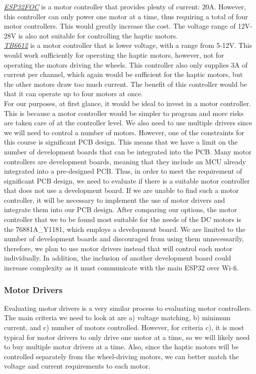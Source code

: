 \noindent \underline{\textit{ESP32FOC}} is a motor controller that provides plenty of current: 20A. However, this controller can only power one motor at a time, thus requiring a total of four motor controllers. This would greatly increase the cost. The voltage range of 12V-28V is also not suitable for controlling the haptic motors.\\

\noindent \underline{\textit{TB6612}} is a motor controller that is lower voltage, with a range from 5-12V. This would work sufficiently for operating the haptic motors, however, not for operating the motors driving the wheels. This controller also only supplies 3A of current per channel, which again would be sufficient for the haptic motors, but the other motors draw too much current. The benefit of this controller would be that it can operate up to four motors at once.\\

\noindent  For our purposes, at first glance, it would be ideal to invest in a motor controller. This is because a motor controller would be simpler to program and more risks are taken care of at the controller level. We also need to use multiple drivers since we will need to control a number of motors. However, one of the constraints for this course is significant PCB design. This means that we have a limit on the number of development boards that can be integrated into the PCB. Many motor controllers are development boards, meaning that they include an MCU already integrated into a pre-designed PCB. Thus, in order to meet the requirement of significant PCB design, we need to evaluate if there is a suitable motor controller that does not use a development board. If we are unable to find such a motor controller, it will be necessary to implement the use of motor drivers and integrate them into our PCB design. After comparing our options, the motor controller that we to be found most suitable for the needs of the DC motors is the 76881A\_Y1181, which employs a development board. We are limited to the number of development boards and discouraged from using them unnecessarily, therefore, we plan to use motor drivers instead that will control each motor individually. In addition, the inclusion of another development board could increase complexity as it must communicate with the main ESP32 over Wi-fi.\\

\subsubsection{Motor Drivers}
\noindent Evaluating motor drivers is a very similar process to evaluating motor controllers. The main criteria we need to look at are a) voltage matching, b) minimum current, and c) number of motors controlled. However, for criteria c), it is most typical for motor drivers to only drive one motor at a time, so we will likely need to buy multiple motor drivers at a time. Also, since the haptic motors will be controlled separately from the wheel-driving motors, we can better match the voltage and current requirements to each motor.\\

